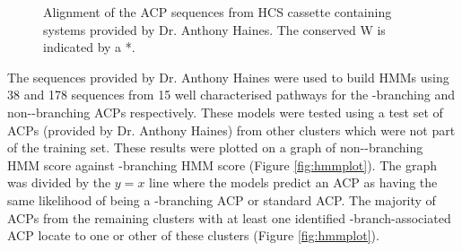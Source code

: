 	\setlength\fboxsep{5pt}
	\setlength\fboxrule{1.5pt}
	\begin{figure}[]
	\centering
	\caption[Alignment of the ACP sequences from HCS cassette containing systems.]{Alignment of the ACP sequences from HCS cassette containing systems provided by Dr. Anthony Haines. The conserved W is indicated by a *.}
	\label{fig:WflagAlignment}
	\end{figure}
		
	 The sequences provided by Dr. Anthony Haines were used to build HMMs using 38 and 178 sequences from 15 well characterised pathways for the \bet-branching and non-\bet-branching ACPs respectively. These models were tested using a test set of ACPs (provided by Dr. Anthony Haines) from other clusters which were not part of the training set. These results were plotted on a graph of non-\bet-branching HMM score against \bet-branching HMM score (Figure \ref{fig:hmmplot}). The graph was divided by the $y=x$ line where the models predict an ACP as having the same likelihood of being a \bet-branching ACP or standard ACP. The majority of ACPs from the remaining clusters with at least one identified \bet-branch-associated ACP locate to one or other of these clusters (Figure \ref{fig:hmmplot}). 
	 
